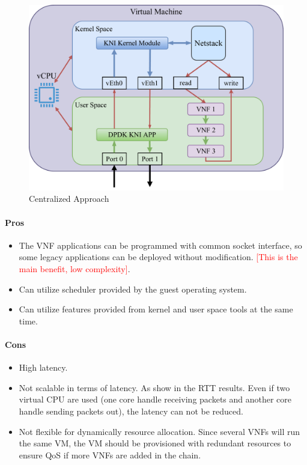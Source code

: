 \documentclass[12pt]{article}
\newcommand{\red}[1]{\textcolor{red}{ [#1]}}
\begin{document}
\begin{figure}[htpb]
    \centering
    \includegraphics[width=0.7\linewidth]{./figures/centralized_approach.pdf}
    \caption{Centralized Approach}
    \label{fig:centralized_approach}
\end{figure}

\paragraph{Pros}
\begin{itemize}
    \item The VNF applications can be programmed with common socket interface, so some legacy applications can be
        deployed without modification. \red{This is the main benefit, low complexity}.
    \item Can utilize scheduler provided by the guest operating system.
    \item Can utilize features provided from kernel and user space tools at the same time.
\end{itemize}

\paragraph{Cons}
\begin{itemize}
    \item High latency.
    \item Not scalable in terms of latency. As show in the RTT results. Even if two virtual CPU are used (one core
        handle receiving packets and another core handle sending packets out), the latency can not be reduced.
    \item Not flexible for dynamically resource allocation. Since several VNFs will run the same VM, the VM should be
        provisioned with redundant resources to ensure QoS if more VNFs are added in the chain.
\end{itemize}
\end{document}
